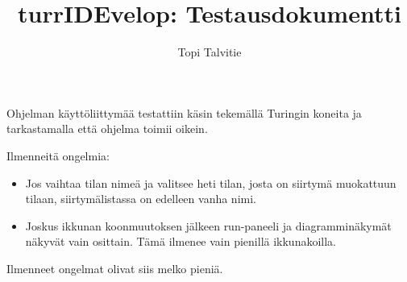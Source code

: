 \documentclass[a4paper, 11pt, finnish]{article}
\author{Topi Talvitie}
\title{turrIDEvelop: Testausdokumentti}
\begin{document}
\maketitle

Ohjelman käyttöliittymää testattiin käsin tekemällä Turingin koneita ja
tarkastamalla että ohjelma toimii oikein.

Ilmenneitä ongelmia:
\begin{itemize}
\item Jos vaihtaa tilan nimeä ja valitsee heti tilan, josta on siirtymä
muokattuun tilaan, siirtymälistassa on edelleen vanha nimi.
\item Joskus ikkunan koonmuutoksen jälkeen run-paneeli ja diagramminäkymät
näkyvät vain osittain. Tämä ilmenee vain pienillä ikkunakoilla.
\end{itemize}
Ilmenneet ongelmat olivat siis melko pieniä.
\end{document}
